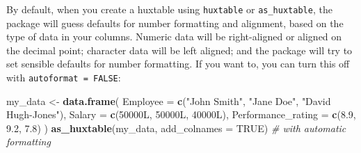 \documentclass[]{article}
\newenvironment{Shaded}{\begin{snugshade}}{\end{snugshade}}
\newcommand{\CommentTok}[1]{\textcolor[rgb]{0.56,0.35,0.01}{\textit{#1}}}
\newcommand{\DataTypeTok}[1]{\textcolor[rgb]{0.13,0.29,0.53}{#1}}
\newcommand{\FloatTok}[1]{\textcolor[rgb]{0.00,0.00,0.81}{#1}}
\newcommand{\KeywordTok}[1]{\textcolor[rgb]{0.13,0.29,0.53}{\textbf{#1}}}
\newcommand{\NormalTok}[1]{#1}
\newcommand{\OtherTok}[1]{\textcolor[rgb]{0.56,0.35,0.01}{#1}}
\newcommand{\StringTok}[1]{\textcolor[rgb]{0.31,0.60,0.02}{#1}}
\begin{document}
By default, when you create a huxtable using \texttt{huxtable} or
\texttt{as\_huxtable}, the package will guess defaults for number
formatting and alignment, based on the type of data in your columns.
Numeric data will be right-aligned or aligned on the decimal point;
character data will be left aligned; and the package will try to set
sensible defaults for number formatting. If you want to, you can turn
this off with \texttt{autoformat\ =\ FALSE}:

\begin{Shaded}
\begin{Highlighting}[]
\NormalTok{my_data <-}\StringTok{ }\KeywordTok{data.frame}\NormalTok{(}
        \DataTypeTok{Employee           =} \KeywordTok{c}\NormalTok{(}\StringTok{"John Smith"}\NormalTok{, }\StringTok{"Jane Doe"}\NormalTok{, }\StringTok{"David Hugh-Jones"}\NormalTok{), }
        \DataTypeTok{Salary             =} \KeywordTok{c}\NormalTok{(50000L, 50000L, 40000L),}
        \DataTypeTok{Performance_rating =} \KeywordTok{c}\NormalTok{(}\FloatTok{8.9}\NormalTok{, }\FloatTok{9.2}\NormalTok{, }\FloatTok{7.8}\NormalTok{)  }
\NormalTok{      )}
\KeywordTok{as_huxtable}\NormalTok{(my_data, }\DataTypeTok{add_colnames =} \OtherTok{TRUE}\NormalTok{) }\CommentTok{# with automatic formatting}
\end{Highlighting}
\end{Shaded}
\end{document}
